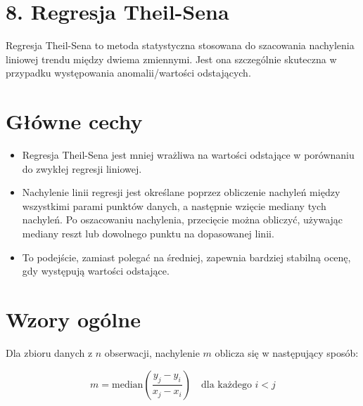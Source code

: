 {}
\justify
\fontsize{14}{16}\selectfont
\setlength{\parindent}{0pt}
\section*{8. Regresja Theil-Sena}
\label{sec:machine_learning_overview}
\fontsize{12}{14}\selectfont
\vspace{-1.0em}

Regresja Theil-Sena to metoda statystyczna stosowana do szacowania nachylenia liniowej trendu między dwiema zmiennymi. Jest ona szczególnie skuteczna w przypadku występowania anomalii/wartości odstających.

{}
\section*{Główne cechy  \cite{url_theil_sen_robust_regression, url_theilsen_regression_and_estimator}}
\vspace{-1.0em}
\label{sec:what_is_ml}

\begin{itemize}

\item Regresja Theil-Sena jest mniej wrażliwa na wartości odstające w porównaniu do zwykłej regresji liniowej. 


\item Nachylenie linii regresji jest określane poprzez obliczenie nachyleń między wszystkimi parami punktów danych, a następnie wzięcie mediany tych nachyleń. 
Po oszacowaniu nachylenia, przecięcie można obliczyć, używając mediany reszt lub dowolnego punktu na dopasowanej linii.


\item To podejście, zamiast polegać na średniej, zapewnia bardziej stabilną ocenę, gdy występują wartości odstające.
\end{itemize}


{}
\section*{Wzory ogólne \cite{url_TheilSenRegressor}}
\vspace{-1.0em}
\label{sec:what_is_ml}

Dla zbioru danych z $n$ obserwacji, nachylenie $m$ oblicza się w następujący sposób:

$$
m = \text{median}\left(\frac{y_j - y_i}{x_j - x_i}\right) \quad \text{dla każdego } i < j
$$

